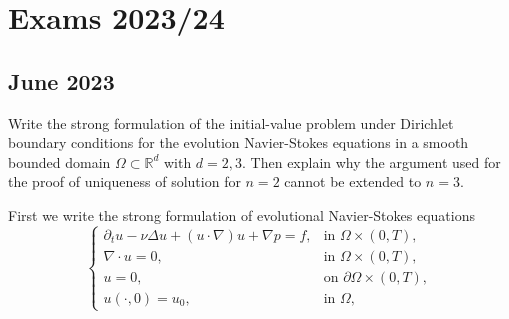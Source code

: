 \section{Exams 2023/24}
\subsection{June 2023}
\begin{exercise}
    Write the strong formulation of the initial-value problem under Dirichlet boundary conditions for the evolution Navier-Stokes equations in a smooth bounded domain $\Omega \subset \mathbb{R}^d$ with $d=2,3$. Then explain why the argument used for the proof of uniqueness of solution for \(n = 2\) cannot be extended to \(n = 3\).
\end{exercise}
First we write the strong formulation of evolutional Navier-Stokes equations
\begin{equation*}
    \begin{cases}
        \partial_t u - \nu \Delta u + (u \cdot \nabla)u + \nabla p = f, & \text{in } \Omega \times (0,T),          \\
        \nabla \cdot u = 0,                                             & \text{in } \Omega \times (0,T),          \\
        u = 0,                                                          & \text{on } \partial \Omega \times (0,T), \\
        u(\cdot,0) = u_0,                                               & \text{in } \Omega,
    \end{cases}
\end{equation*}

